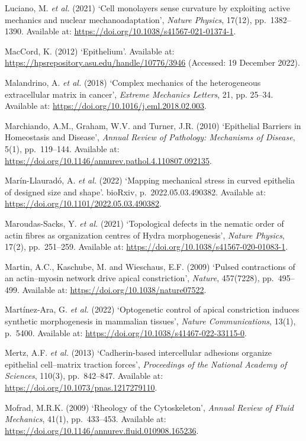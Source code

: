 \documentclass[
]{article}
\begin{document}
Luciano, M. \emph{et al.} (2021) `Cell monolayers sense curvature by
exploiting active mechanics and nuclear mechanoadaptation', \emph{Nature
Physics}, 17(12), pp.~1382--1390. Available at:
\url{https://doi.org/10.1038/s41567-021-01374-1}.

MacCord, K. (2012) `Epithelium'. Available at:
\url{https://hpsrepository.asu.edu/handle/10776/3946} (Accessed: 19
December 2022).

Malandrino, A. \emph{et al.} (2018) `Complex mechanics of the
heterogeneous extracellular matrix in cancer', \emph{Extreme Mechanics
Letters}, 21, pp. 25--34. Available at:
\url{https://doi.org/10.1016/j.eml.2018.02.003}.

Marchiando, A.M., Graham, W.V. and Turner, J.R. (2010) `Epithelial
Barriers in Homeostasis and Disease', \emph{Annual Review of Pathology:
Mechanisms of Disease}, 5(1), pp.~119--144. Available at:
\url{https://doi.org/10.1146/annurev.pathol.4.110807.092135}.

Marín-Llauradó, A. \emph{et al.} (2022) `Mapping mechanical stress in
curved epithelia of designed size and shape'. bioRxiv,
p.~2022.05.03.490382. Available at:
\url{https://doi.org/10.1101/2022.05.03.490382}.

Maroudas-Sacks, Y. \emph{et al.} (2021) `Topological defects in the
nematic order of actin fibres as organization centres of Hydra
morphogenesis', \emph{Nature Physics}, 17(2), pp.~251--259. Available
at: \url{https://doi.org/10.1038/s41567-020-01083-1}.

Martin, A.C., Kaschube, M. and Wieschaus, E.F. (2009) `Pulsed
contractions of an actin--myosin network drive apical constriction',
\emph{Nature}, 457(7228), pp.~495--499. Available at:
\url{https://doi.org/10.1038/nature07522}.

Martínez-Ara, G. \emph{et al.} (2022) `Optogenetic control of apical
constriction induces synthetic morphogenesis in mammalian tissues',
\emph{Nature Communications}, 13(1), p.~5400. Available at:
\url{https://doi.org/10.1038/s41467-022-33115-0}.

Mertz, A.F. \emph{et al.} (2013) `Cadherin-based intercellular adhesions
organize epithelial cell--matrix traction forces', \emph{Proceedings of
the National Academy of Sciences}, 110(3), pp.~842--847. Available at:
\url{https://doi.org/10.1073/pnas.1217279110}.

Mofrad, M.R.K. (2009) `Rheology of the Cytoskeleton', \emph{Annual
Review of Fluid Mechanics}, 41(1), pp.~433--453. Available at:
\url{https://doi.org/10.1146/annurev.fluid.010908.165236}.
\end{document}
